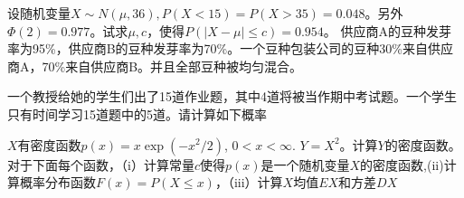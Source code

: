 \documentclass[10pt,addpoints,portrait]{exam}
\begin{document}
		\begin{questions} %
			\question[8]
			设随机变量$X\sim N(\mu, 36), P(X < 15) = P(X > 35) = 0.048$。另外$\Phi(2) = 0.977$。试求$\mu, c$，使得$P(|X - \mu| \leq c) = 0.954$。
			\vspace{3cm}
			\question
			供应商A的豆种发芽率为95\%，供应商B的豆种发芽率为70\%。一个豆种包装公司的豆种30\%来自供应商A，70\%来自供应商B。并且全部豆种被均匀混合。
			
			\question
			一个教授给她的学生们出了15道作业题，其中4道将被当作期中考试题。一个学生只有时间学习15道题中的5道。请计算如下概率
			\question[10]
			$X$有密度函数$p(x) = x\exp(-x ^ 2 / 2)$, $0 < x < \infty$. $Y = X ^ 2$。计算$Y$的密度函数。\\
			\vspace{4cm}
			\question
			对于下面每个函数，（i）计算常量$c$使得$p(x)$是一个随机变量$X$的密度函数,(ii)计算概率分布函数$F(x) = P(X \leq x)$，（iii）计算$X$均值$EX$和方差$DX$
\end{questions}
\end{document}

